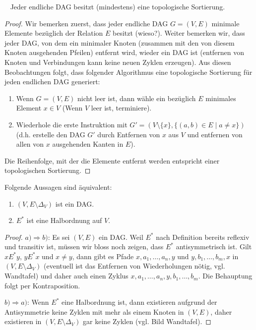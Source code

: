 \begin{satz}~
    Jeder endliche DAG besitzt (mindestens) eine topologische Sortierung.
\end{satz}
\begin{proof}
    Wir bemerken zuerst, dass jeder endliche DAG $G=(V,E)$ minimale Elemente bezüglich der Relation $E$ besitzt (wieso?). Weiter bemerken wir, dass jeder DAG, von dem ein minimaler Knoten (zusammen mit den von diesem Knoten ausgehenden Pfeilen) entfernt wird, wieder ein DAG ist (entfernen von Knoten und Verbindungen kann keine neuen Zyklen erzeugen). Aus diesen Beobachtungen folgt, dass folgender Algorithmus eine topologische Sortierung für jeden endlichen DAG generiert:
    \begin{enumerate}
        \item Wenn $G=(V,E)$ nicht leer ist, dann wähle ein bezüglich $E$ minimales Element $x\in V$ (Wenn $V$ leer ist, terminiere).
        \item Wiederhole die erste Instruktion mit $G'=(V\setminus \{x\},\{(a,b)\in E\mid a\neq x \})$ (d.h. erstelle den DAG $G'$ durch Entfernen von $x$ aus $V$ und entfernen von allen von $x$ ausgehenden Kanten in $E$).
    \end{enumerate}
Die Reihenfolge, mit der die Elemente entfernt werden entspricht einer topologischen Sortierung.
\end{proof}


\begin{satz}
    Folgende Aussagen sind äquivalent:
    \begin{enumerate}
        \item $(V,E\setminus \Delta_V)$ ist ein DAG.
        \item $E^*$ ist eine Halbordnung auf $V$.
    \end{enumerate}
\end{satz}
\begin{proof}
    $a)\Rightarrow b)$: Es sei $(V,E)$ ein DAG. Weil $E^*$ nach Definition bereits
    reflexiv und transitiv ist, müssen wir bloss noch zeigen, dass $E^*$
    antisymmetrisch ist. Gilt $xE^*y$, $yE^*x$ und $x\neq y$, dann gibt es
    Pfade $x,a_1,\dots,a_n,y$ und $y,b_1,\dots,b_m,x$ in $(V,E\setminus \Delta_V)$ (eventuell ist das Entfernen von Wiederholungen nötig, vgl. Wandtafel) und daher auch
    einen Zyklus $x,a_1,\dots,a_n,y,b_1,\dots,b_m$. Die Behauptung folgt per
    Kontraposition.

    $b)\Rightarrow a)$: Wenn $E^*$ eine Halbordnung ist, dann existieren aufgrund der
    Antisymmetrie keine Zyklen mit mehr als einem Knoten in $(V,E)$, daher existieren in
    $(V,E\setminus\Delta_V)$ gar keine Zyklen (vgl. Bild Wandtafel).
\end{proof}

